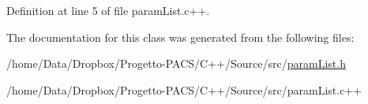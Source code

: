 Definition at line 5 of file param\-List.\-c++.



The documentation for this class was generated from the following files\-:\begin{DoxyCompactItemize}
\item 
/home/\-Data/\-Dropbox/\-Progetto-\/\-P\-A\-C\-S/\-C++/\-Source/src/\hyperlink{paramList_8h}{param\-List.\-h}\item 
/home/\-Data/\-Dropbox/\-Progetto-\/\-P\-A\-C\-S/\-C++/\-Source/src/param\-List.\-c++\end{DoxyCompactItemize}
